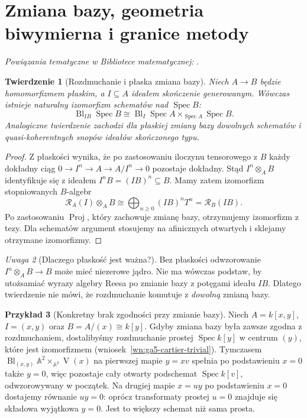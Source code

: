 \documentclass[11pt,a4paper,openany]{report}
\numberwithin{equation}{section}
\theoremstyle{plain}
\newtheorem{twierdzenie}{Twierdzenie}[section]
\theoremstyle{definition}
\newtheorem{przyklad}[twierdzenie]{Przykład}
\theoremstyle{remark}
\newtheorem{uwaga}[twierdzenie]{Uwaga}
\newcommand{\A}{\mathbb A}
\newcommand{\V}{\operatorname V}
\newcommand{\Spec}{\operatorname{Spec}}
\begin{document}
\section{Zmiana bazy, geometria biwymierna i granice metody}
\label{sec:ga5-basechange}

\noindent\emph{Powiązania tematyczne w Bibliotece matematycznej:} .


\begin{twierdzenie}[Rozdmuchanie i płaska zmiana bazy]
\label{tw:ga5-flat-basechange}
Niech $A\to B$ będzie homomorfizmem płaskim,
a $I\subseteq A$ ideałem skończenie generowanym.
Wówczas istnieje naturalny izomorfizm schematów nad
$\Spec B$:
\[
 \operatorname{Bl}_{IB}\Spec B\cong
 \operatorname{Bl}_{I}\Spec A\times_{\Spec A}\Spec B.
\]
Analogiczne twierdzenie zachodzi dla płaskiej zmiany
bazy dowolnych schematów i quasi-koherentnych
snopów ideałów skończonego typu.
\end{twierdzenie}
\begin{proof}
Z płaskości wynika, że po zastosowaniu iloczynu tensorowego z $B$
każdy dokładny ciąg
$0\to I^n\to A\to A/I^n\to0$ pozostaje dokładny.
Stąd $I^n\otimes_A B$ identyfikuje się z ideałem
$I^nB=(IB)^n\subseteq B$. Mamy zatem izomorfizm
stopniowanych $B$-algebr
\[
 \mathcal R_A(I)\otimes_A B\cong
 \bigoplus_{n\ge0}(IB)^nT^n=\mathcal R_B(IB).
\]
Po zastosowaniu $\operatorname{Proj}$, który zachowuje
zmianę bazy, otrzymujemy izomorfizm z tezy.
Dla schematów argument stosujemy na afinicznych
otwartych i sklejamy otrzymane izomorfizmy.
\end{proof}

\begin{uwaga}[Dlaczego płaskość jest ważna?]
Bez płaskości odwzorowanie $I^n\otimes_A B\to B$
może mieć niezerowe jądro. Nie ma wówczas podstaw,
by utożsamiać wyrazy algebry Reesa po zmianie bazy
z potęgami ideału $IB$. Dlatego twierdzenie nie mówi,
że rozdmuchanie komutuje z \emph{dowolną} zmianą bazy.
\end{uwaga}

\begin{przyklad}[Konkretny brak zgodności przy zmianie bazy]
Niech $A=k[x,y]$, $I=(x,y)$ oraz
$B=A/(x)\cong k[y]$. Gdyby zmiana bazy była zawsze
zgodna z rozdmuchaniem, dostalibyśmy rozdmuchanie
prostej $\Spec k[y]$ w centrum $(y)$, które jest
izomorfizmem (wniosek~\ref{wn:ga5-cartier-trivial}).
Tymczasem
$\operatorname{Bl}_{(x,y)}\A^2\times_{\A^2}\V(x)$
na pierwszej mapie $y=xv$ spełnia po podstawieniu
$x=0$ także $y=0$, więc pozostaje cały
otwarty podschemat $\Spec k[v]$, odwzorowywany w początek.
Na drugiej mapie $x=uy$ po podstawieniu $x=0$
dostajemy równanie $uy=0$: oprócz transformaty
prostej $u=0$ znajduje się składowa wyjątkowa
$y=0$. Jest to większy schemat niż sama prosta.
\end{przyklad}
\end{document}
